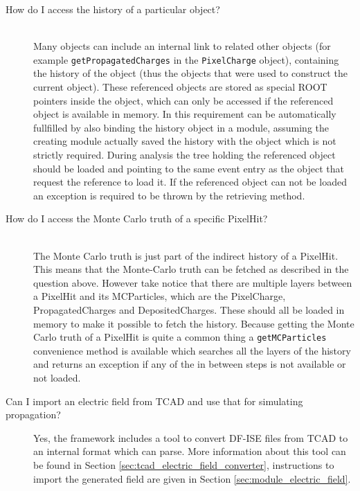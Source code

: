 \begin{description}
\item[How do I access the history of a particular object?]\mbox{}\\ Many objects can include an internal link to related other objects (for example \texttt{getPropagatedCharges} in the \texttt{PixelCharge} object), containing the history of the object (thus the objects that were used to construct the current object). These referenced objects are stored as special ROOT pointers inside the object, which can only be accessed if the referenced object is available in memory. In \apsq this requirement can be automatically fullfilled by also binding the history object in a module, assuming the creating module actually saved the history with the object which is not strictly required. During analysis the tree holding the referenced object should be loaded and pointing to the same event entry as the object that request the reference to load it. If the referenced object can not be loaded an exception is required to be thrown by the retrieving method.
\item[How do I access the Monte Carlo truth of a specific PixelHit?]\mbox{}\\ The Monte Carlo truth is just part of the indirect history of a PixelHit. This means that the Monte-Carlo truth can be fetched as described in the question above. However take notice that there are multiple layers between a PixelHit and its MCParticles, which are the PixelCharge, PropagatedCharges and DepositedCharges. These should all be loaded in memory to make it possible to fetch the history. Because getting the Monte Carlo truth of a PixelHit is quite a common thing a \texttt{getMCParticles} convenience method is available which searches all the layers of the history and returns an exception if any of the in between steps is not available or not loaded.
\item[Can I import an electric field from TCAD and use that for simulating propagation?] Yes, the framework includes a tool to convert DF-ISE files from TCAD to an internal format which \apsq can parse. More information about this tool can be found in Section \ref{sec:tcad_electric_field_converter}, instructions to import the generated field are given in Section \ref{sec:module_electric_field}.
\end{description}

